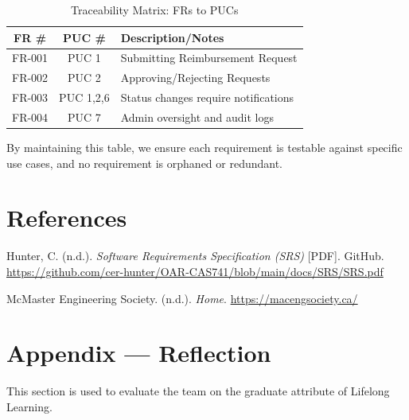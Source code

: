 \documentclass[12pt]{article}
\begin{document}
\begin{table}[h]
  \centering
  \caption{Traceability Matrix: FRs to PUCs}
  \begin{tabular}{|c|c|l|}
    \hline
    \textbf{FR \#} & \textbf{PUC \#} & \textbf{Description/Notes} \\
    \hline
    FR-001 & PUC 1 & Submitting Reimbursement Request \\
    \hline
    FR-002 & PUC 2 & Approving/Rejecting Requests \\
    \hline
    FR-003 & PUC 1,2,6 & Status changes require notifications \\
    \hline
    FR-004 & PUC 7 & Admin oversight and audit logs \\
    \hline
  \end{tabular}
\end{table}

By maintaining this table, we ensure each requirement is testable against specific use cases, and no requirement is orphaned or redundant.

\section*{References}
\begin{flushleft}
Hunter, C. (n.d.). \textit{Software Requirements Specification (SRS)} [PDF]. GitHub.  
\url{https://github.com/cer-hunter/OAR-CAS741/blob/main/docs/SRS/SRS.pdf}

\medskip

McMaster Engineering Society. (n.d.). \textit{Home}.  
\url{https://macengsociety.ca/}
\end{flushleft}

\section*{Appendix --- Reflection}
This section is used to evaluate the team on the graduate attribute of Lifelong Learning.  
\end{document}

